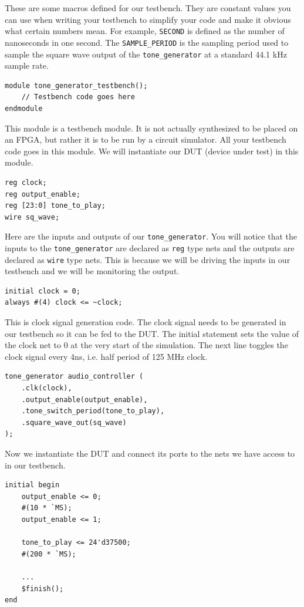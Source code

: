 \documentclass[11pt]{article}
\begin{document}
These are some macros defined for our testbench. They are constant values you can use when writing your testbench to simplify your code and make it obvious what certain numbers mean. For example, \verb|SECOND| is defined as the number of nanoseconds in one second. The \verb|SAMPLE_PERIOD| is the sampling period used to sample the square wave output of the \verb|tone_generator| at a standard 44.1 kHz sample rate.

\begin{verbatim}
module tone_generator_testbench();
	// Testbench code goes here
endmodule
\end{verbatim}

This module is a testbench module. It is not actually synthesized to be placed on an FPGA, but rather it is to be run by a circuit simulator. All your testbench code goes in this module. We will instantiate our DUT (device under test) in this module.

\begin{verbatim}
reg clock;
reg output_enable;
reg [23:0] tone_to_play;
wire sq_wave;
\end{verbatim}

Here are the inputs and outputs of our \verb|tone_generator|. You will notice that the inputs to the \verb|tone_generator| are declared as \verb|reg| type nets and the outputs are declared as \verb|wire| type nets. This is because we will be driving the inputs in our testbench and we will be monitoring the output.

\begin{verbatim}
initial clock = 0;
always #(4) clock <= ~clock;
\end{verbatim}

This is clock signal generation code. The clock signal needs to be generated in our testbench so it can be fed to the DUT. The initial statement sets the value of the clock net to 0 at the very start of the simulation. The next line toggles the clock signal every 4ns, i.e. half period of 125 MHz clock.

\begin{verbatim}
tone_generator audio_controller (
    .clk(clock),
    .output_enable(output_enable),
	.tone_switch_period(tone_to_play),
    .square_wave_out(sq_wave)
);
\end{verbatim}

Now we instantiate the DUT and connect its ports to the nets we have access to in our testbench.

\begin{verbatim}
initial begin
    output_enable <= 0;
    #(10 * `MS);
    output_enable <= 1;
    
    tone_to_play <= 24'd37500;
    #(200 * `MS);
   
    ...
    $finish();
end
\end{verbatim}
\end{document}
